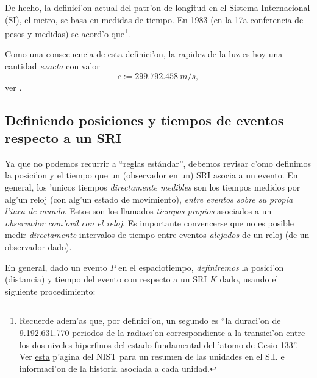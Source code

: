 De hecho, la definici'on actual del patr'on de longitud en el Sistema
Internacional (SI), el metro, se basa en medidas de tiempo. En 1983 (en la 17a
conferencia de pesos y medidas) se acord'o que\footnote{Recuerde adem'as que, por definici'on, un segundo es ``la duraci'on de 9.192.631.770 periodos de la radiaci'on correspondiente a la transici'on entre los dos niveles hiperfinos del estado fundamental del 'atomo de Cesio 133''. Ver \href{http://physics.nist.gov/cuu/Units/current.html}{esta} p'agina del NIST para un resumen de las unidades en el S.I. e informaci'on de la historia asociada a cada unidad.}.
\begin{quotation}
\end{quotation}
Como una consecuencia de esta definici'on, la rapidez de la luz es hoy una
cantidad \textit{exacta} con valor
\begin{equation}
\boxed{c:=299.792.458\ m/s,}
\end{equation}
ver \cite{CODATA00}.

\subsection{Definiendo posiciones y tiempos de eventos respecto a un SRI}

Ya que no podemos recurrir a ``reglas est\'andar'', debemos revisar c'omo definimos la posici'on y el tiempo que un (observador en un) SRI asocia a un evento. En general, los 'unicos tiempos \textit{directamente medibles} son los tiempos medidos por alg'un reloj (con alg'un estado de movimiento), \textit{entre eventos sobre su propia l'inea de mundo}. Estos son los llamados \textit{tiempos propios} asociados a un \textit{observador com'ovil con el reloj}. Es importante convencerse que no es posible medir \textit{directamente} intervalos de tiempo entre eventos \textit{alejados} de un reloj (de un observador dado).

En general, dado un evento $P$ en el espaciotiempo, \textit{definiremos} la posici'on (distancia) y tiempo del evento con respecto a un SRI $K$ dado, usando el siguiente procedimiento:

